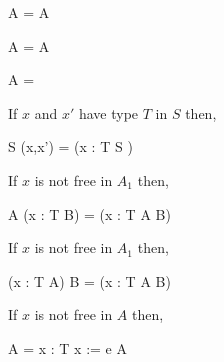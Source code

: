 \begin{law}
  \label{seq-unitl-law}
  \begin{circus}
    \Skip \circseq A = A
  \end{circus}
\end{law}

\begin{law}
  \label{seq-unitr-law}
  \begin{circus}
     A \circseq \Skip = A
  \end{circus}
\end{law}

\begin{law}
  \label{seq-zerol-law}
  \begin{circus}
    \Chaos \circseq A = \Chaos
  \end{circus}
\end{law}

\begin{law}
  \label{schema-hide-var-conv-law}
  If $x$ and $x'$ have type $T$ in $S$ then,
  \begin{circus}
    \lschexpract S \hide (x,x') \rschexpract
    =
    (\circvar x : T \circspot \lschexpract S \rschexpract)
  \end{circus}
\end{law}
  
\begin{law}
  \label{var-seq-extl-law}
  If $x$ is not free in $A_1$ then,
  \begin{circus}
    A \circseq (\circvar x : T \circspot B)
    =
    (\circvar x : T \circspot A \circseq B)
  \end{circus}
\end{law}

\begin{law}
  \label{var-seq-extr-law}
  If $x$ is not free in $A_1$ then,
  \begin{circus}
    (\circvar x : T \circspot A) \circseq B
    =
    (\circvar x : T \circspot A \circseq B)
  \end{circus}
\end{law}

\begin{law}
  \label{var-assign-intro-law}
  If $x$ is not free in $A$ then,
  \begin{circus}
    A
    =
    \circvar x : T \circspot x := e \circseq A
  \end{circus}
\end{law}

